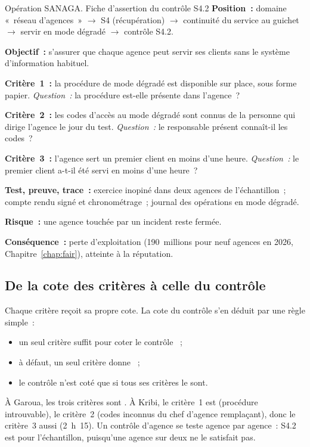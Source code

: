 \begin{boxscenario}{Opération SANAGA. Fiche d'assertion du contrôle S4.2}
\textbf{Position~:} domaine «~réseau d'agences~» $\rightarrow$ S4
(récupération) $\rightarrow$ continuité du service au guichet
$\rightarrow$ servir en mode dégradé $\rightarrow$ contrôle S4.2.

\medskip
\textbf{Objectif~:} s'assurer que chaque agence peut servir ses clients
sans le système d'information habituel.

\medskip
\textbf{Critère~1~:} la procédure de mode dégradé est disponible sur place,
sous forme papier. \emph{Question~:} la procédure est-elle présente dans
l'agence~?

\textbf{Critère~2~:} les codes d'accès au mode dégradé sont connus de la
personne qui dirige l'agence le jour du test. \emph{Question~:} le
responsable présent connaît-il les codes~?

\textbf{Critère~3~:} l'agence sert un premier client en moins d'une heure.
\emph{Question~:} le premier client a-t-il été servi en moins d'une
heure~?

\medskip
\textbf{Test, preuve, trace~:} exercice inopiné dans deux agences de
l'échantillon~; compte rendu signé et chronométrage~; journal des
opérations en mode dégradé.

\medskip
\textbf{Risque~:} une agence touchée par un incident reste fermée.

\textbf{Conséquence~:} perte d'exploitation (190~millions pour neuf agences
en 2026, Chapitre~\ref{chap:fair}), atteinte à la réputation.
\end{boxscenario}

\subsection{De la cote des critères à celle du contrôle}

Chaque critère reçoit sa propre cote. La cote du contrôle s'en déduit par
une règle simple~:
\begin{itemize}
    \item un seul critère \NON{} suffit pour coter le contrôle \NON{}~;
    \item à défaut, un seul critère \NEK{} donne \NEK{}~;
    \item le contrôle n'est coté \OUI{} que si tous ses critères le sont.
\end{itemize}

À Garoua, les trois critères sont \OUI{}. À Kribi, le critère~1 est \NON{}
(procédure introuvable), le critère~2 \NON{} (codes inconnus du chef
d'agence remplaçant), donc le critère~3 aussi (2~h~15). Un contrôle
d'agence se teste agence par agence~: S4.2 est \NON{} pour l'échantillon,
puisqu'une agence sur deux ne le satisfait pas.


